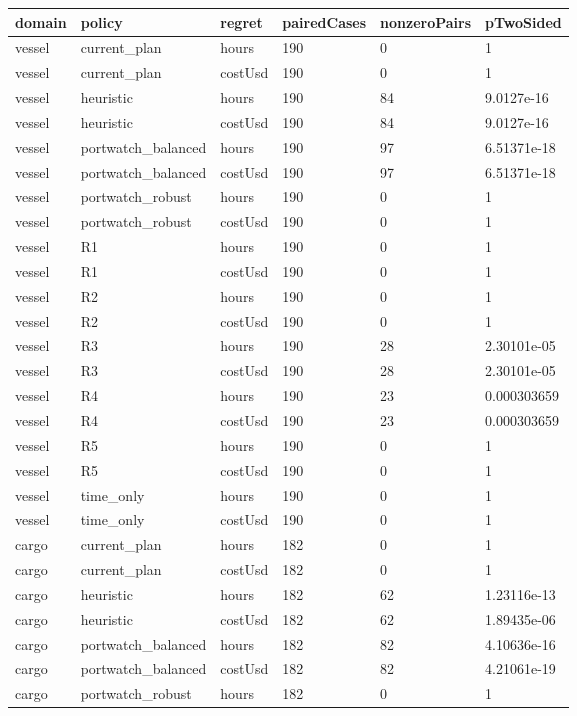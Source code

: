 \begin{tabular}{llllll}
\toprule
domain & policy & regret & pairedCases & nonzeroPairs & pTwoSided \\
\midrule
vessel & current\_plan & hours & 190 & 0 & 1 \\
vessel & current\_plan & costUsd & 190 & 0 & 1 \\
vessel & heuristic & hours & 190 & 84 & 9.0127e-16 \\
vessel & heuristic & costUsd & 190 & 84 & 9.0127e-16 \\
vessel & portwatch\_balanced & hours & 190 & 97 & 6.51371e-18 \\
vessel & portwatch\_balanced & costUsd & 190 & 97 & 6.51371e-18 \\
vessel & portwatch\_robust & hours & 190 & 0 & 1 \\
vessel & portwatch\_robust & costUsd & 190 & 0 & 1 \\
vessel & R1 & hours & 190 & 0 & 1 \\
vessel & R1 & costUsd & 190 & 0 & 1 \\
vessel & R2 & hours & 190 & 0 & 1 \\
vessel & R2 & costUsd & 190 & 0 & 1 \\
vessel & R3 & hours & 190 & 28 & 2.30101e-05 \\
vessel & R3 & costUsd & 190 & 28 & 2.30101e-05 \\
vessel & R4 & hours & 190 & 23 & 0.000303659 \\
vessel & R4 & costUsd & 190 & 23 & 0.000303659 \\
vessel & R5 & hours & 190 & 0 & 1 \\
vessel & R5 & costUsd & 190 & 0 & 1 \\
vessel & time\_only & hours & 190 & 0 & 1 \\
vessel & time\_only & costUsd & 190 & 0 & 1 \\
cargo & current\_plan & hours & 182 & 0 & 1 \\
cargo & current\_plan & costUsd & 182 & 0 & 1 \\
cargo & heuristic & hours & 182 & 62 & 1.23116e-13 \\
cargo & heuristic & costUsd & 182 & 62 & 1.89435e-06 \\
cargo & portwatch\_balanced & hours & 182 & 82 & 4.10636e-16 \\
cargo & portwatch\_balanced & costUsd & 182 & 82 & 4.21061e-19 \\
cargo & portwatch\_robust & hours & 182 & 0 & 1 \\

\end{tabular}

